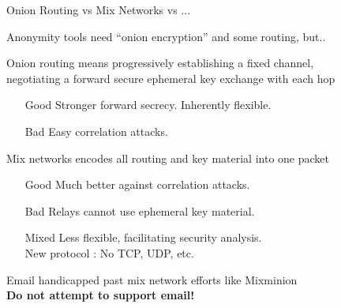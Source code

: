 \documentclass[fleqn,xcolor={usenames,dvipsnames}]{beamer}
\begin{document}
\begin{comment}
\begin{frame}[t]{Onion Routing vs Mix Networks vs ...}

Anonymizing transports for spherical cows :
\begin{itemize}
\item Dining Cryptographers Networks (DC-nets) \\
 \hspace*{2pt} Aims for even lower latency. $O(n^2)$ bandwidth
\item Private Information Retrieval (PIR) \\
 \hspace*{2pt} Highly application specific.  $O(n^2)$ bandwidth/computation
\item Verifiable mix networks \\
 \hspace*{2pt} Expose packet dropping attacks. $O(n^2)$ computation
\end{itemize}

\end{frame}
\end{comment}


\begin{frame}[t]{Onion Routing vs Mix Networks vs ...}

Anonymity tools need ``onion encryption'' and some routing, but..

\bigskip

Onion routing means progressively establishing a fixed channel, \\
negotiating a forward secure ephemeral key exchange with each hop \\
\begin{itemize}
\item[Good] Stronger forward secrecy.  Inherently flexible.
\item[Bad] Easy correlation attacks.
\end{itemize}

\medskip

Mix networks encodes all routing and key material into one packet
\begin{itemize}
\item[Good] Much better against correlation attacks.
\item[Bad] Relays cannot use ephemeral key material. 
\item[Mixed] Less flexible, facilitating security analysis. \\
  New protocol :  No TCP, UDP, etc.
\end{itemize}

\medskip\pause
Email handicapped past mix network efforts like Mixminion \\
 \hspace*{10pt} {\bf Do not attempt to support email!}

\end{frame}
\end{document}
